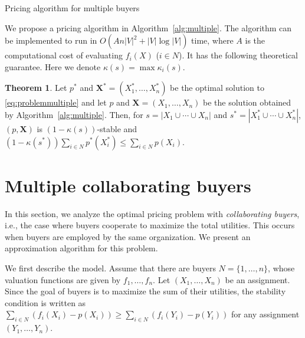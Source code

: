 \documentclass[letterpaper]{article}
\theoremstyle{definition}
\newtheorem{theorem}{Theorem}
\begin{document}
\begin{algorithm}[tb]
\caption{Pricing algorithm for multiple buyers}
\label{alg:multiple}
\begin{algorithmic}
\end{algorithmic}
\end{algorithm}
We propose a pricing algorithm in Algorithm~\ref{alg:multiple}.
The algorithm can be implemented to run in $O(A n |V|^2 + |V| \log |V|)$ time,
where $A$ is the computational cost of evaluating $f_i(X)$ ($i \in N$).
It has the following theoretical guarantee.
Here we denote \(\kappa(s)=\max \kappa_i(s)\).
\begin{theorem}
\label{thm:multiplepricing}
Let $p^*$ and $\mathbf{X}^*=(X_1^*, \ldots, X_n^*)$ be the optimal solution to \eqref{eq:problemmultiple}
and let $p$ and $\mathbf{X}=(X_1, \ldots, X_n)$ be the solution obtained by Algorithm~\ref{alg:multiple}.
Then, for $s = |X_1 \cup \cdots \cup X_n|$ and $s^* = |X_1^* \cup \cdots \cup X_n^*|$,
\((p,\mathbf{X})\) is $(1-\kappa(s))$-stable and
$  (1 - \kappa(s^*)) \sum_{i\in N} p^*(X_i^*) \le \sum_{i\in N} p(X_i)$.
\end{theorem}


\section{Multiple collaborating buyers}
\label{sec:collaborate}

In this section, we analyze the optimal pricing problem with \emph{collaborating buyers}, i.e., the case where buyers cooperate to maximize the total utilities.
This occurs when buyers are employed by the same organization.
We present an approximation algorithm for this problem.

We first describe the model.
Assume that there are buyers $N = \{1, \ldots, n\}$, whose valuation functions are given by $f_1, \ldots, f_n$.
Let $(X_1, \ldots, X_n)$ be an assignment.
Since the goal of buyers is to maximize the sum of their utilities, the stability condition is written as
$\sum_{i\in N}(f_i(X_i)-p(X_i)) \ge \sum_{i\in N}(f_i(Y_i)-p(Y_i))$ for any assignment $(Y_1, \ldots, Y_n)$.
\end{document}
